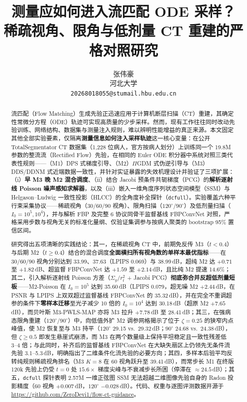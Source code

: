 \documentclass[11pt,UTF8]{ctexart}
\title{\textbf{测量应如何进入流匹配 ODE 采样？}\\
\large 稀疏视角、限角与低剂量 CT 重建的严格对照研究}
\author{张伟豪\\
  河北大学\\
  \texttt{20268018055@stumail.hbu.edu.cn}}
\date{}
\begin{document}
\maketitle

\begin{abstract}
流匹配（Flow Matching）生成先验正迅速应用于计算机断层扫描（CT）重建，其确定性常微分方程（ODE）轨迹可实现高质量的少步采样。然而，现有工作往往同时改动先验训练、网络结构、数据集与测量注入规则，难以辨明性能增益的真正来源。本文固定其他全部实验要素，仅隔离\textbf{测量信息如何注入采样轨迹}这一核心变量：在公开 TotalSegmentator CT 数据集（1{,}228 位病人，官方按病人划分）上训练同一个 19.8M 参数的整流流（Rectified Flow）先验，在相同的 Euler ODE 积分器中系统对照三类代表性规则——（M1）DPS 式梯度引导、（M2）$\Pi$GDM 式伪逆引导与（M3）DDS/DDNM 式近端数据一致性，并针对实证暴露的失效机理设计并验证了三项扩展：（i）\textbf{早 M3 晚 M2 混合调度}、（ii）结合 Jacobi 预条件共轭梯度（PCG）的\textbf{解析逐射线 Poisson 噪声感知求解器}，以及（iii）嵌入一维角度序列状态空间模型（SSM）与 Helgason--Ludwig 一致性投影（HLCC）的全角度补全探针（\texttt{dcfull}）。实验覆盖六种平行束采集协议——稀疏视角（30/60/90 视角）、限角扫描（$120^\circ$/$90^\circ$）及低剂量扫描（$I_0{=}10^5, 10^4$），并与解析 FBP 及完整 6 协议同骨干监督基线 FBPConvNet 对照，严格采用步数与视角无关的标准化量纲、仅验证集调参与按病人聚类的 bootstrap 95\% 置信区间。

研究得出五项清晰的实践结论：其一，在稀疏视角 CT 中，前期免反传 M3（$t{<}0.4$）与后期 M2（$t{\ge}0.4$）结合的混合调度\textbf{全面横扫所有视角数的单样本最优指标}——在 30/60/90 视角分别达到 33.99、37.63（LPIPS 0.069）与 38.99\,dB，超纯 M2 达 $+0.71$ 至 $+1.82$\,dB、超监督 FBPConvNet 达 $+1.59$ 至 $+2.14$\,dB，且比纯 M2 提速 14.6\%；其二，引入解析逐射线 Poisson 方差（$\Sigma_y/r_t^2$ + Jacobi PCG）\textbf{彻底弥合并反超低剂量短板}——M2-Poisson 在 $I_0{=}10^5$ 达到 35.60\,dB（LPIPS 0.079，超无噪 M2 $+2.44$\,dB，在 PSNR 与 LPIPS 上双双超过监督基线 FBPConvNet 的 35.32\,dB），并在完全不重调超参的条件下\textbf{零样本迁移}至光子减少 10 倍的 $I_0{=}10^4$ 达到 30.18\,dB（超原 M2 $+7.65$\,dB），而贝叶斯 M3-PWLS-MAP 亦将 M3 拉升 $+7.78$\,dB 至 28.41\,dB；其三，在强病态限角重建（$120^\circ$/$90^\circ$）中，向低值外扩 M2 调参网格揭示了位于 $\zeta{=}0.25$ 的狭窄内点峰值，使 M2 恢复至与 M3 持平（$120^\circ$ 29.15 vs.\ 29.32\,dB；$90^\circ$ 24.68 vs.\ 24.38\,dB），但 $\zeta{\ge}0.5$ 即发生悬崖式崩溃，而 M3 在两个数量级上保持平坦稳定且一致性残差低 $3\text{--}4$ 倍；与此同时，补齐后的监督基线 FBPConvNet 在大缺失扇区上仍领先无条件流先验 3.1--5.3\,dB，明确指出了二维条件化流先验的必要方向；其四，多样本后验平均反转纯规则稀疏视角排名（M3 $K{=}8$ 在 60 视角跃升至 39.41\,dB），而常步长 M1 在终版 120k 先验上仍受 $t{=}0$ 处 $15.6\times$ 梯度尖峰与不衰减步长所困（停滞在 $\approx 24.5$\,dB）；其五，\texttt{dcfull} 探针表明 2.57M 一维正弦图 SSM 无法超越二维图像先验自身的 Radon 投影精度（60 视角 $+0.007$\,dB，$120^\circ$ $-0.028$\,dB）。代码、权重与逐图评测数据开源于 \url{https://github.com/ZeroDevi1/flow-ct-guidance}。
\end{abstract}
\end{document}
